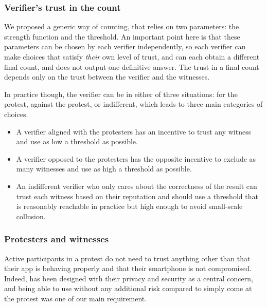  \subsubsection{Verifier's trust in the count} We proposed a generic way of counting, that relies on two parameters: the strength function and the threshold.
An important point here is that these parameters can be chosen by each verifier independently, so each verifier can make choices that satisfy \emph{their} own level of trust, and can each obtain a different final count, and \CROCUS does not output one definitive answer. The trust in a final count depends only on the trust between the verifier and the witnesses.

In practice though, the verifier can be in either of three situations: for the protest, against the protest, or indifferent, which leads to three main categories of choices.
\begin{itemize}
	\item A verifier aligned with the protesters has an incentive to trust any witness and use as low a threshold as possible.
	\item A verifier opposed to the protesters has the opposite incentive to exclude as many witnesses and use as high a threshold as possible.
	\item An indifferent verifier who only cares about the correctness of the result can trust each witness based on their reputation and should use a threshold that is reasonably reachable in practice but high enough to avoid small-scale collusion.
\end{itemize}

\subsubsection{Protesters and witnesses} Active participants in a protest do not need to trust anything other than that their app is behaving properly and that their smartphone is not compromised. Indeed, \CROCUS has been designed with their privacy and security as a central concern, and being able to use \CROCUS without any additional risk compared to simply come at the protest was one of our main requirement.
